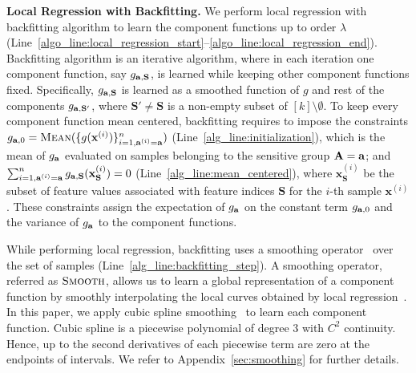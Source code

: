 \noindent\textbf{Local Regression with Backfitting.} We perform local regression with backfitting algorithm to learn the component functions up to order $ \lambda $ (Line~\ref{algo_line:local_regression_start}--\ref{algo_line:local_regression_end}). Backfitting algorithm is an iterative algorithm, where in each iteration one component function, say $ g_{\mathbf{a}, \mathbf{S}} $, is learned while keeping other component functions fixed. Specifically, $ g_{\mathbf{a}, \mathbf{S}} $ is learned as a smoothed function of $ g $ and rest of the components $ g_{\mathbf{a}, \mathbf{S}'} $, where $ \mathbf{S}' \ne \mathbf{S} $ is a non-empty subset of $ [k]\setminus \emptyset $. To keep every component function mean centered, backfitting requires to impose the constraints $ g_{\mathbf{a}, 0} = \textsc{Mean}(\{g(\mathbf{x}^{(i)})\}_{i=1, \mathbf{a}^{(i)} = \mathbf{a}}^n) $ (Line~\ref{alg_line:initialization}), which is the mean of $ g_{\mathbf{a}} $ evaluated on samples belonging to the sensitive group $ \mathbf{A} = \mathbf{a} $;  and $ \sum_{i=1, \mathbf{a}^{(i)} = \mathbf{a}}^ng_{\mathbf{a}, \mathbf{S}}(\mathbf{x}_{\mathbf{S}}^{(i)}) = 0$ (Line~\ref{alg_line:mean_centered}), where $ \mathbf{x}_{\mathbf{S}}^{(i)} $ be the subset of feature values associated with feature indices $ \mathbf{S} $ for the $ i $-th sample $ \mathbf{x}^{(i)} $. These constraints assign the expectation of $ g_{\mathbf{a}} $ on the constant term $ g_{\mathbf{a}, 0} $ and the variance of $ g_{\mathbf{a}} $ to the component functions.                                       


While performing local regression, backfitting uses a smoothing operator~\cite{loader2012smoothing} over the set of samples (Line~\ref{alg_line:backfitting_step}). A smoothing operator, referred as $ \textsc{Smooth} $, allows us to learn a global representation of a component function by smoothly interpolating the local curves obtained by local regression~\cite{loader2012smoothing}. In this paper, we apply cubic spline smoothing~\cite{li2010global} to learn each component function. Cubic spline is a piecewise polynomial of degree $ 3 $ with $ C^2 $ continuity. Hence, up to the second derivatives of each piecewise term are zero at the endpoints of intervals. We refer to Appendix~\ref{sec:smoothing} for further details.%



